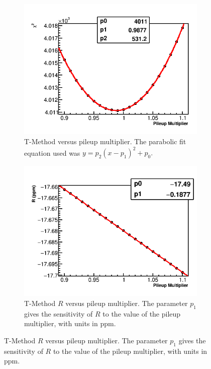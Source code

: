 \begin{figure}[h]
\centering
    \begin{subfigure}[t]{0.45\textwidth}
        \centering
        \includegraphics[width=\textwidth]{TMethod_Chi2_Vs_PileupMultiplier_Canv}
        \caption{T-Method \chisq versus pileup multiplier. The parabolic fit equation used was $y = p_{2}(x - p_{1})^{2} + p_{0}.$}
    \end{subfigure}%
    \hspace{1cm}
    \begin{subfigure}[t]{0.45\textwidth}
        \centering
        \includegraphics[width=\textwidth]{TMethod_R_Vs_PileupMultiplier_Canv}
        \caption{T-Method $R$ versus pileup multiplier. The parameter $p_{1}$ gives the sensitivity of $R$ to the value of the pileup multiplier, with units in ppm.}
    \end{subfigure}


\end{figure}
